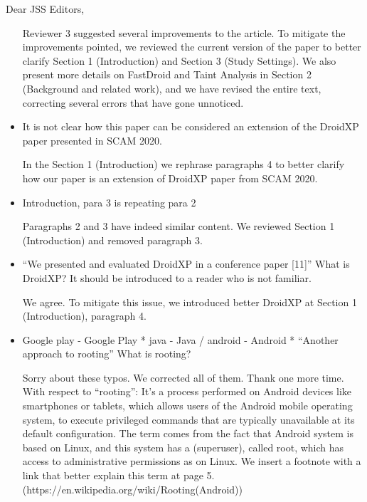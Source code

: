 \documentclass[12pt,english]{scrartcl}
\begin{document}
\begin{letter}{Dear JSS Editors,}
\begin{itemize}
{\color{blue}{\bf Answer.} Reviewer 3 suggested several improvements to the article. To mitigate the improvements pointed, we reviewed the current version of the paper to better clarify Section 1 (Introduction) and Section 3 (Study Settings). We also present more details on FastDroid and Taint Analysis in Section 2 (Background and related work), and we have revised the entire text, correcting several errors that have gone unnoticed.}

\vspace{0.2cm}


\item It is not clear how this paper can be considered an extension of the DroidXP paper presented in SCAM 2020.


\vspace{0.2cm}

{\color{blue}{\bf Answer.} In the Section 1 (Introduction) we rephrase paragraphs 4 to better clarify how our paper is an extension of DroidXP paper from SCAM 2020.}

\vspace{0.2cm}

\item Introduction, para 3 is repeating para 2

\vspace{0.2cm}

{\color{blue}{\bf Answer.} Paragraphs 2 and 3 have indeed similar content. We reviewed Section 1 (Introduction) and removed paragraph 3.}

\vspace{0.2cm}

\item ``We presented and evaluated DroidXP in a conference paper [11]''
What is DroidXP? It should be introduced to a reader who is not familiar.


\vspace{0.2cm}

{\color{blue}{\bf Answer.} We agree. To mitigate this issue, we introduced better DroidXP at Section 1 (Introduction), paragraph 4.}

\vspace{0.2cm}

\item Google play - Google Play
* java - Java / android - Android
* ``Another approach to rooting''
What is rooting?

\vspace{0.2cm}

{\color{blue}{\bf Answer.} Sorry about these typos. We corrected all of them. Thank one more time. With respect to ``rooting'': It's a process performed on Android devices like smartphones or tablets, which allows users of the Android mobile operating system, to execute privileged commands that are typically unavailable at its default configuration. The term comes from the fact that Android system is based on Linux, and this system has a (superuser), called root, which has access to administrative permissions as on Linux. We insert a footnote with a link that better explain this term at page 5.\newline
(https://en.wikipedia.org/wiki/Rooting(Android))
}


\end{itemize}
\end{letter}
\end{document}
